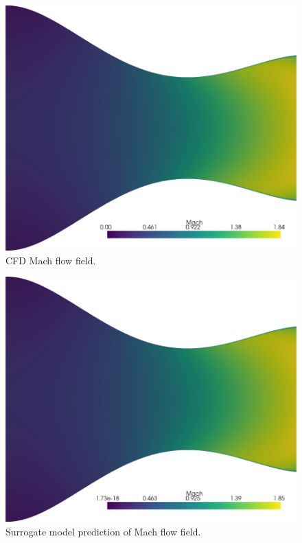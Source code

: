 \documentclass[10pt,oneside,a4paper,twocolumn]{article}
\begin{document}
\begin{figure}[htbp]
  \centering
  \includegraphics[width=0.8\columnwidth]{figures/Mach_field_cfd.png}
  \caption{CFD Mach flow field.}
  \label{fig:cfd_mach}
\end{figure}

\begin{figure}[htbp]
  \centering
  \includegraphics[width=0.8\columnwidth]{figures/Mach_field_reconstructed.png}
  \caption{Surrogate model prediction of Mach flow field.}
  \label{fig:prediction_mach}
\end{figure}
\end{document}
